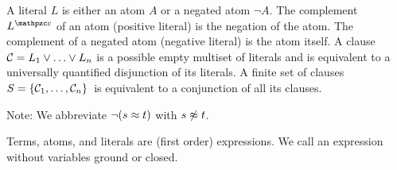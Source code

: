 
\begin{definition}\label{def:literals}
A {\myem literal} $L$ is either an atom $A$ or a negated atom $\lnot A$.
The {\myem complement } $L^\mcc$ of an atom (positive literal) is the negation of the atom.
The complement of a negated atom (negative literal) is the atom itself. 
%
A {\myem clause}\ \ ${\mathcal C} = L_1\lor\ldots\lor L_n$  is a possible empty multiset of literals 
and is equivalent to a universally quantified disjunction of its literals.
%
A finite {\myem set of clauses} $S=\{ {\mathcal C}_1,\ldots,{\mathcal C}_n \}$ is equivalent to a conjunction of all its clauses.
%
\end{definition}

\noindent Note: We abbreviate $\lnot(s\approx t)$ with $s\not\approx t$.

\begin{definition}
	Terms, atoms, and literals are (first order) expressions.
	We call an expression without variables {\myem ground} or {\myem closed}.
\end{definition}

